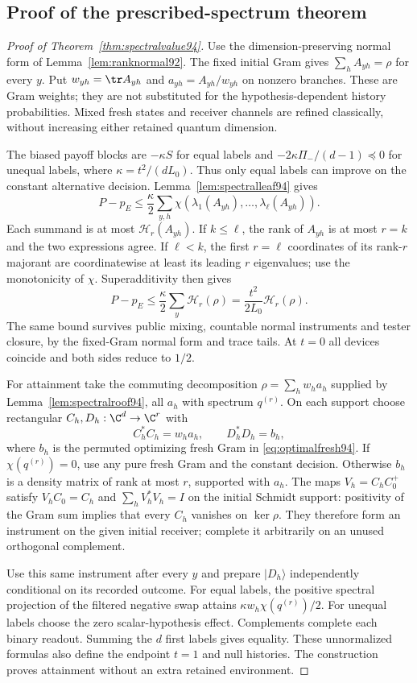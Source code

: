 \subsection{Proof of the prescribed-spectrum theorem}
\begin{proof}[Proof of Theorem~\ref{thm:spectralvalue94}]
Use the dimension-preserving normal form of
Lemma~\ref{lem:ranknormal92}.  The fixed initial Gram gives
$\sum_hA_{yh}=\rho$ for every $y$.  Put $w_{yh}=\tr A_{yh}$ and
$a_{yh}=A_{yh}/w_{yh}$ on nonzero branches.  These are Gram weights;
they are not substituted for the hypothesis-dependent history
probabilities.  Mixed fresh states and receiver channels are refined
classically, without increasing either retained quantum dimension.

The biased payoff blocks are $-\kappa S$ for equal labels and
$-2\kappa\Pi_-/(d-1)\preceq0$ for unequal labels, where
$\kappa=t^2/(dL_0)$.  Thus only equal labels can improve on the
constant alternative decision.  Lemma~\ref{lem:spectralleaf94} gives
\[
 P-p_E\le\frac{\kappa}{2}\sum_{y,h}
                  \chi(\lambda_1(A_{yh}),\ldots,\lambda_\ell(A_{yh})).
\]
Each summand is at most $\mathcal H_r(A_{yh})$.  If $k\le\ell$, the
rank of $A_{yh}$ is at most $r=k$ and the two expressions agree.  If
$\ell<k$, the first $r=\ell$ coordinates of its rank-$r$ majorant
are coordinatewise at least its leading $r$ eigenvalues; use the
monotonicity of $\chi$.  Superadditivity then gives
\[
 P-p_E\le\frac{\kappa}{2}\sum_y\mathcal H_r(\rho)
                    =\frac{t^2}{2L_0}\mathcal H_r(\rho).
\]
The same bound survives public mixing, countable normal instruments
and tester closure, by the fixed-Gram normal form and trace tails.
At $t=0$ all devices coincide and both sides reduce to $1/2$.

For attainment take the commuting decomposition
$\rho=\sum_hw_ha_h$ supplied by Lemma~\ref{lem:spectralroof94}, all
$a_h$ with spectrum $q^{(r)}$.  On each support choose rectangular
$C_h,D_h:\C^d\to\C^r$ with
\[
 C_h^*C_h=w_ha_h,\qquad D_h^*D_h=b_h,
\]
where $b_h$ is the permuted optimizing fresh Gram in
\eqref{eq:optimalfresh94}.  If $\chi(q^{(r)})=0$, use any pure
fresh Gram and the constant decision.  Otherwise $b_h$ is a density
matrix of rank at most $r$, supported with $a_h$.  The maps
$V_h=C_hC_0^+$ satisfy $V_hC_0=C_h$ and
$\sum_hV_h^*V_h=I$ on the initial Schmidt support: positivity of the
Gram sum implies that every $C_h$ vanishes on $\ker\rho$.
They therefore form an instrument on the given initial receiver;
complete it arbitrarily on an unused orthogonal complement.

Use this same instrument after every $y$ and prepare $|D_h\rangle$
independently conditional on its recorded outcome.  For equal labels,
the positive spectral projection of the filtered negative swap attains
$\kappa w_h\chi(q^{(r)})/2$.  For unequal labels choose the zero
scalar-hypothesis effect.  Complements complete each binary readout.
Summing the $d$ first labels gives equality.  These unnormalized
formulas also define the endpoint $t=1$ and null histories.  The
construction proves attainment without an extra retained environment.
\end{proof}

